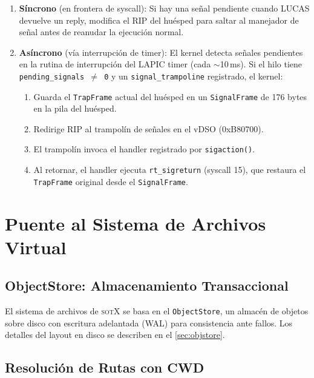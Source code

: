 \documentclass[11pt,twoside,openright]{book}
\theoremstyle{definition}
\theoremstyle{plain}
\theoremstyle{remark}
\newcommand{\sotos}{\textsc{sotX}}
\begin{document}
\begin{enumerate}
    \item \textbf{Síncrono} (en frontera de syscall): Si hay una señal pendiente
          cuando LUCAS devuelve un reply, modifica el RIP del huésped para saltar
          al manejador de señal antes de reanudar la ejecución normal.

    \item \textbf{Asíncrono} (vía interrupción de timer): El kernel detecta señales
          pendientes en la rutina de interrupción del LAPIC timer (cada $\sim$10\,ms).
          Si el hilo tiene \texttt{pending\_signals $\neq$ 0} y un
          \texttt{signal\_trampoline} registrado, el kernel:
          \begin{enumerate}
              \item Guarda el \texttt{TrapFrame} actual del huésped en un
                    \texttt{SignalFrame} de 176 bytes en la pila del huésped.
              \item Redirige RIP al trampolín de señales en el vDSO (0xB80700).
              \item El trampolín invoca el handler registrado por \texttt{sigaction()}.
              \item Al retornar, el handler ejecuta \texttt{rt\_sigreturn} (syscall 15),
                    que restaura el \texttt{TrapFrame} original desde el
                    \texttt{SignalFrame}.
          \end{enumerate}
\end{enumerate}

\section{Puente al Sistema de Archivos Virtual}
\label{sec:lucas-vfs}

\subsection{ObjectStore: Almacenamiento Transaccional}

El sistema de archivos de \sotos{} se basa en el \texttt{ObjectStore}, un almacén
de objetos sobre disco con escritura adelantada (WAL) para consistencia ante
fallos. Los detalles del layout en disco se describen en el \cref{sec:objstore}.

\subsection{Resolución de Rutas con CWD}
\end{document}
